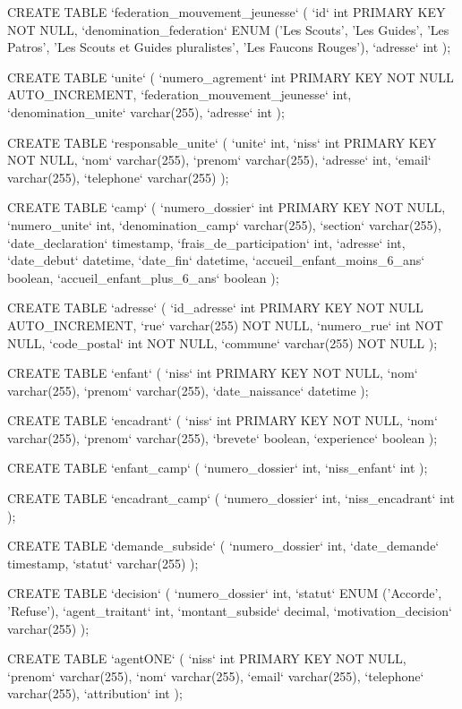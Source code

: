 CREATE TABLE `federation_mouvement_jeunesse` (
  `id` int PRIMARY KEY NOT NULL,
  `denomination_federation` ENUM ('Les Scouts', 'Les Guides', 'Les Patros', 'Les Scouts et Guides pluralistes', 'Les Faucons Rouges'),
  `adresse` int
);

CREATE TABLE `unite` (
  `numero_agrement` int PRIMARY KEY NOT NULL AUTO_INCREMENT,
  `federation_mouvement_jeunesse` int,
  `denomination_unite` varchar(255),
  `adresse` int
);

CREATE TABLE `responsable_unite` (
  `unite` int,
  `niss` int PRIMARY KEY NOT NULL,
  `nom` varchar(255),
  `prenom` varchar(255),
  `adresse` int,
  `email` varchar(255),
  `telephone` varchar(255)
);

CREATE TABLE `camp` (
  `numero_dossier` int PRIMARY KEY NOT NULL,
  `numero_unite` int,
  `denomination_camp` varchar(255),
  `section` varchar(255),
  `date_declaration` timestamp,
  `frais_de_participation` int,
  `adresse` int,
  `date_debut` datetime,
  `date_fin` datetime,
  `accueil_enfant_moins_6_ans` boolean,
  `accueil_enfant_plus_6_ans` boolean
);

CREATE TABLE `adresse` (
  `id_adresse` int PRIMARY KEY NOT NULL AUTO_INCREMENT,
  `rue` varchar(255) NOT NULL,
  `numero_rue` int NOT NULL,
  `code_postal` int NOT NULL,
  `commune` varchar(255) NOT NULL
);

CREATE TABLE `enfant` (
  `niss` int PRIMARY KEY NOT NULL,
  `nom` varchar(255),
  `prenom` varchar(255),
  `date_naissance` datetime
);

CREATE TABLE `encadrant` (
  `niss` int PRIMARY KEY NOT NULL,
  `nom` varchar(255),
  `prenom` varchar(255),
  `brevete` boolean,
  `experience` boolean
);

CREATE TABLE `enfant_camp` (
  `numero_dossier` int,
  `niss_enfant` int
);

CREATE TABLE `encadrant_camp` (
  `numero_dossier` int,
  `niss_encadrant` int
);

CREATE TABLE `demande_subside` (
  `numero_dossier` int,
  `date_demande` timestamp,
  `statut` varchar(255)
);

CREATE TABLE `decision` (
  `numero_dossier` int,
  `statut` ENUM ('Accorde', 'Refuse'),
  `agent_traitant` int,
  `montant_subside` decimal,
  `motivation_decision` varchar(255)
);

CREATE TABLE `agentONE` (
  `niss` int PRIMARY KEY NOT NULL,
  `prenom` varchar(255),
  `nom` varchar(255),
  `email` varchar(255),
  `telephone` varchar(255),
  `attribution` int
);


